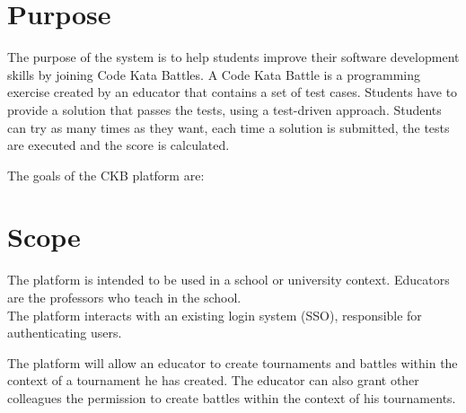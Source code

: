 \section{Purpose}
The purpose of the system is to help students improve their software development skills by joining Code Kata Battles.
A Code Kata Battle is a programming exercise created by an educator that contains a set of test cases.
Students have to provide a solution that passes the tests, using a test-driven approach.
Students can try as many times as they want, each time a solution is submitted, the tests are executed and the score is calculated.

The goals of the CKB platform are:

\begin{enumerate}[label=\textbf{G\arabic*}:,ref=G\arabic*,leftmargin=1.3cm]
\end{enumerate}

\pagebreak

\section{Scope}
The platform is intended to be used in a school or university context.
Educators are the professors who teach in the school.\\
The platform interacts with an existing login system (SSO), responsible for authenticating users.

The platform will allow an educator to create tournaments and battles within the context of a tournament he has created.
The educator can also grant other colleagues the permission to create battles within the context of his tournaments.

